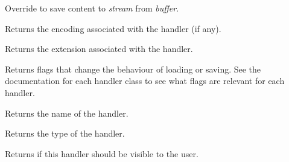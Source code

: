 \label{wxrichtextfilehandlerdosavefile}


Override to save content to {\it stream} from {\it buffer}.

\label{wxrichtextfilehandlergetencoding}


Returns the encoding associated with the handler (if any).

\label{wxrichtextfilehandlergetextension}


Returns the extension associated with the handler.

\label{wxrichtextfilehandlergetflags}


Returns flags that change the behaviour of loading or saving. See the documentation for each
handler class to see what flags are relevant for each handler.

\label{wxrichtextfilehandlergetname}


Returns the name of the handler.

\label{wxrichtextfilehandlergettype}


Returns the type of the handler.

\label{wxrichtextfilehandlerisvisible}


Returns \true if this handler should be visible to the user.

\label{wxrichtextfilehandlerloadfile}



